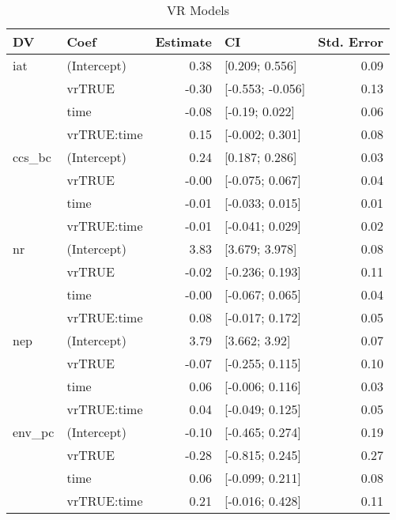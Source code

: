 \begin{table}[ht]
\centering
\begin{tabular}{llrlr}
  \hline
DV & Coef & Estimate & CI & Std. Error \\ 
  \hline
iat & (Intercept) & 0.38 & [0.209; 0.556] & 0.09 \\ 
   & vrTRUE & -0.30 & [-0.553; -0.056] & 0.13 \\ 
   & time & -0.08 & [-0.19; 0.022] & 0.06 \\ 
   & vrTRUE:time & 0.15 & [-0.002; 0.301] & 0.08 \\ 
   \hline
ccs\_bc & (Intercept) & 0.24 & [0.187; 0.286] & 0.03 \\ 
   & vrTRUE & -0.00 & [-0.075; 0.067] & 0.04 \\ 
   & time & -0.01 & [-0.033; 0.015] & 0.01 \\ 
   & vrTRUE:time & -0.01 & [-0.041; 0.029] & 0.02 \\ 
   \hline
nr & (Intercept) & 3.83 & [3.679; 3.978] & 0.08 \\ 
   & vrTRUE & -0.02 & [-0.236; 0.193] & 0.11 \\ 
   & time & -0.00 & [-0.067; 0.065] & 0.04 \\ 
   & vrTRUE:time & 0.08 & [-0.017; 0.172] & 0.05 \\ 
   \hline
nep & (Intercept) & 3.79 & [3.662; 3.92] & 0.07 \\ 
   & vrTRUE & -0.07 & [-0.255; 0.115] & 0.10 \\ 
   & time & 0.06 & [-0.006; 0.116] & 0.03 \\ 
   & vrTRUE:time & 0.04 & [-0.049; 0.125] & 0.05 \\ 
   \hline
env\_pc & (Intercept) & -0.10 & [-0.465; 0.274] & 0.19 \\ 
   & vrTRUE & -0.28 & [-0.815; 0.245] & 0.27 \\ 
   & time & 0.06 & [-0.099; 0.211] & 0.08 \\ 
   & vrTRUE:time & 0.21 & [-0.016; 0.428] & 0.11 \\ 
   \hline
\end{tabular}
\caption{VR Models } 
\label{tab:vr-models}
\end{table}
